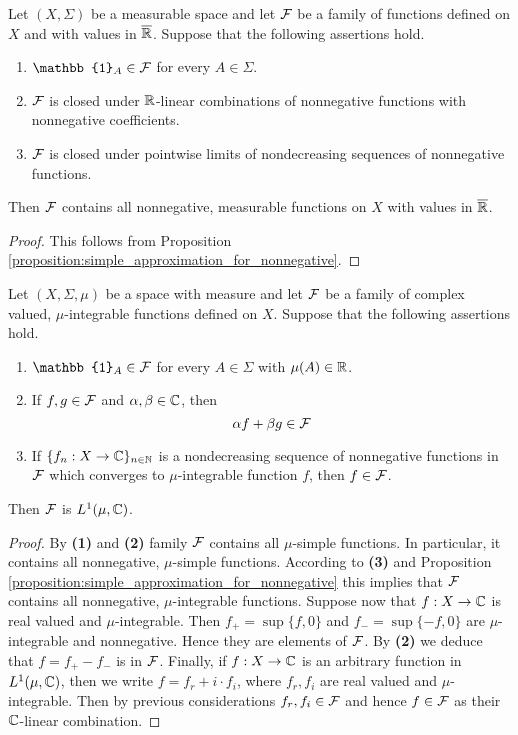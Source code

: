 \begin{corollary}\label{corollary:measurable_induction_for_nonnegative}
Let $(X,\Sigma)$ be a measurable space and let ${\mathcal F}$ be a family of functions defined on $X$ and with values in $\overline{{\mathbb R}}$. Suppose that the following assertions hold.
\begin{enumerate}[label=\emph{\textbf{(\arabic*)}}, leftmargin=*]
\item $\mathbb{1}_A\in \cF$ for every $A\in \Sigma$.
\item ${\mathcal F}$ is closed under ${\mathbb R}$-linear combinations of nonnegative functions with nonnegative coefficients.
\item ${\mathcal F}$ is closed under pointwise limits of nondecreasing sequences of nonnegative functions.
\end{enumerate}
Then ${\mathcal F}$ contains all nonnegative, measurable functions on $X$ with values in $\overline{{\mathbb R}}$.
\end{corollary}
\begin{proof}
This follows from Proposition \ref{proposition:simple_approximation_for_nonnegative}.
\end{proof}

\begin{corollary}\label{corollary:measurable_induction_for_complex}
Let $(X,\Sigma,\mu)$ be a space with measure and let ${\mathcal F}$ be a family of complex valued, $\mu$-integrable functions defined on $X$. Suppose that the following assertions hold.
\begin{enumerate}[label=\emph{\textbf{(\arabic*)}}, leftmargin=*]
\item $\mathbb{1}_A\in \cF$ for every $A\in \Sigma$ with $\mu(A)\in {\mathbb R}$.
\item If $f, g\in {\mathcal F}$ and $\alpha, \beta\in {\mathbb C}$, then
$$\alpha f + \beta g\in {\mathcal F}$$
\item If $\{f_n:X\rightarrow {\mathbb C}\}_{n\in {\mathbb N}}$ is a nondecreasing sequence of nonnegative functions in ${\mathcal F}$ which converges to $\mu$-integrable function $f$, then $f\in {\mathcal F}$.
\end{enumerate}
Then ${\mathcal F}$ is $L^1(\mu, {\mathbb C})$.
\end{corollary}
\begin{proof}
By \textbf{(1)} and \textbf{(2)} family ${\mathcal F}$ contains all $\mu$-simple functions. In particular, it contains all nonnegative, $\mu$-simple functions. According to \textbf{(3)} and Proposition \ref{proposition:simple_approximation_for_nonnegative} this implies that ${\mathcal F}$ contains all nonnegative, $\mu$-integrable functions. Suppose now that $f:X\rightarrow {\mathbb C}$ is real valued and $\mu$-integrable. Then $f_+ = \sup \{f, 0\}$ and $f_- = \sup\{-f, 0\}$ are $\mu$-integrable and nonnegative. Hence they are elements of ${\mathcal F}$. By \textbf{(2)} we deduce that $f = f_+ - f_-$ is in ${\mathcal F}$. Finally, if $f:X\rightarrow {\mathbb C}$ is an arbitrary function in $L^1(\mu, {\mathbb C})$, then we write $f = f_r + i\cdot f_i$, where $f_r, f_i$ are real valued and $\mu$-integrable. Then by previous considerations $f_r,f_i\in {\mathcal F}$ and hence $f\in {\mathcal F}$ as their ${\mathbb C}$-linear combination.
\end{proof}

